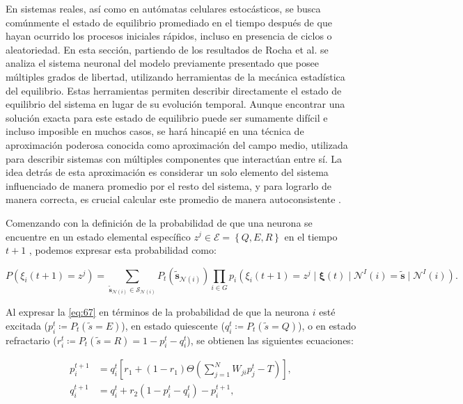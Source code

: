 En sistemas reales, así como en autómatas celulares estocásticos, se busca comúnmente el estado de equilibrio promediado en el tiempo después de que hayan ocurrido los procesos iniciales rápidos, incluso en presencia de ciclos o aleatoriedad. En esta sección, partiendo de los resultados de Rocha et al. \cite{rocha_homeostatic_2018} se analiza el sistema neuronal del modelo previamente presentado que posee múltiples grados de libertad, utilizando herramientas de la mecánica estadística del equilibrio. Estas herramientas permiten describir directamente el estado de equilibrio del sistema en lugar de su evolución temporal. Aunque encontrar una solución exacta para este estado de equilibrio puede ser sumamente difícil e incluso imposible en muchos casos, se hará hincapié en una técnica de aproximación poderosa conocida como aproximación del campo medio, utilizada para describir sistemas con múltiples componentes que interactúan entre sí. La idea detrás de esta aproximación es considerar un solo elemento del sistema influenciado de manera promedio por el resto del sistema, y para lograrlo de manera correcta, es crucial calcular este promedio de manera autoconsistente \cite{bar-yam_dynamics_2003}.

Comenzando con la definición de la probabilidad de que una neurona se encuentre en un estado elemental específico $z^j \in \mathcal{E}=\left\{Q,E,R\right\}$  en el tiempo $t+1$   , podemos expresar esta probabilidad como:

\begin{equation}\label{eq:67}
	P\left(\xi_i(t+1)=z^j\right)=\sum_{\tilde{\mathbf{s}}_{\mathcal{N}(i)}\in\mathcal{S}_{\mathcal{N}(i)}}{P_t(\tilde{\mathbf{s}}_{\mathcal{N}(i)})}\prod_{i\in G}  {p_i\left(\xi_i(t+1)=z^j \mid  \bm{\xi}(t)\mid  \mathcal{N}^I(i) = \tilde{\mathbf{s}}\mid \mathcal{N}^I(i)   \right)}.	
\end{equation}

Al expresar la  \cref{eq:67}  en términos de la probabilidad de que la neurona $i$ esté excitada ($p_i^t \coloneqq  P_t(\tilde{s}=E)$),  en estado quiescente ($q_i^t \coloneqq  P_t(\tilde{s}=Q)$),  o en estado refractario ($r_i^t \coloneqq  P_t(\tilde{s}=R) =1-p_i^t-q_i^t$), se obtienen las siguientes ecuaciones:


\begin{align}
p_i^{t+1}&=q_i^t\left[r_1+\left(1-r_1\right)\Theta\left(\sum_{j=1}^{N}W_{ji}p_j^t-T\right)\right], \label{eq:56}\\
q_i^{t+1}&=q_i^t+r_2\left(1-p_i^t-q_i^t\right)-p_i^{t+1} \label{eq:57},
\end{align}

